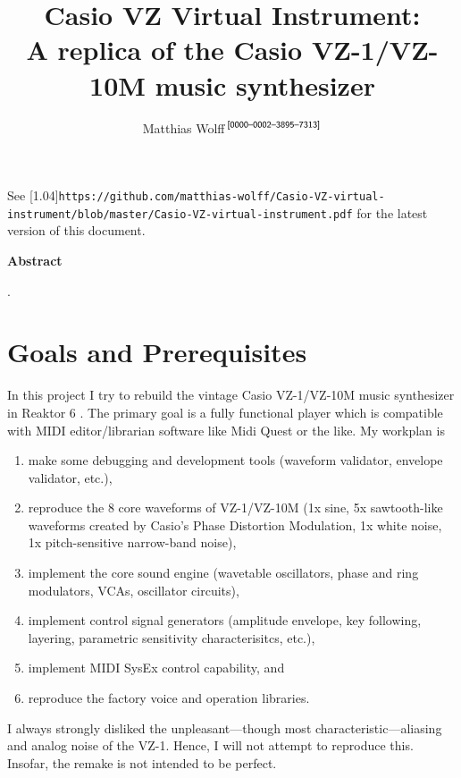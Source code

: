 \documentclass[a4paper]{article}
\newcommand{\TT}[1]{\protect\scalebox{0.75}[1.04]{\texttt{#1}}}
\newcommand{\TODO}[1]{%
  \fboxsep=1pt\fboxrule=1pt\fcolorbox{yellow}{white}{[\textbf{TODO:~}#1]}%
}
\begin{document}
%
\author{Matthias Wolff$^{\text{\sf\,[0000--0002--3895--7313]}}$}
\title{Casio VZ Virtual Instrument:\\
A replica of the Casio VZ-1/VZ-10M music synthesizer}
\maketitle

\bigskip\noindent
See \TT{https://github.com/matthias-wolff/Casio-VZ-virtual-instrument/blob/master/Casio-VZ-virtual-instrument.pdf}
for the latest version of this document.
\begin{center}
  \bigskip\bigskip
  \begin{minipage}{0.9\linewidth}
    \textbf{Abstract}

    \bigskip
    \TODO{\ldots}.

  \end{minipage}
  \vfill
  \vfill
\end{center}
\clearpage

\tableofcontents
\clearpage


\section{Goals and Prerequisites}
In this project I try to rebuild the vintage Casio VZ-1/VZ-10M music synthesizer
in Reaktor 6 \cite{Reaktor6}. The primary goal is a fully functional player
which is compatible with MIDI editor/librarian software like Midi Quest
\cite{MidiQuest12} or the like. My workplan is
\begin{enumerate}   
  \item 
    make some debugging and development tools (waveform validator, envelope
    validator, etc.),
  \item
    reproduce the 8 core waveforms of VZ-1/VZ-10M (1x sine, 5x sawtooth-like
    waveforms created by Casio's Phase Distortion Modulation, 1x white noise, 1x
    pitch-sensitive narrow-band noise),
  \item
    implement the core sound engine (wavetable oscillators, phase and ring
    modulators, VCAs, oscillator circuits),
  \item
    implement control signal generators (amplitude envelope, key following,
    layering, parametric sensitivity characterisitcs, etc.),
  \item
    implement MIDI SysEx control capability, and
  \item
    reproduce the factory voice and operation libraries.
\end{enumerate}
I always strongly disliked the unpleasant---though most
characteristic---aliasing and analog noise of the VZ-1. Hence, I will not
attempt to reproduce this. Insofar, the remake is not intended to be perfect.
\end{document}
